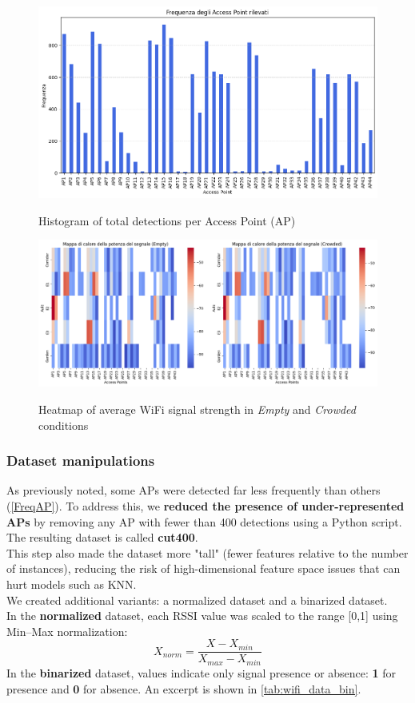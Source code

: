 \documentclass{article}
\begin{document}
\begin{figure}[ht!]
    \centering
    {\includegraphics[scale=0.50]{img/output.png}}
    \caption{Histogram of total detections per Access Point (AP)}
    \label{FreqAP}
\end{figure}

\begin{figure}[ht!]
    \centering
    {\includegraphics[scale=0.38]{img/ColorMap.png}}
    \caption{Heatmap of average Wi\-Fi signal strength in \textit{Empty} and \textit{Crowded} conditions}
    \label{heatmap}
\end{figure}

\subsubsection{Dataset manipulations}
As previously noted, some APs were detected far less frequently than others (\autoref{FreqAP}). To address this, we \textbf{reduced the presence of under-represented APs} by removing any AP with fewer than 400 detections using a Python script. The resulting dataset is called \textbf{cut400}.\\
This step also made the dataset more "tall" (fewer features relative to the number of instances), reducing the risk of high-dimensional feature space issues that can hurt models such as KNN.\\
We created additional variants: a normalized dataset and a binarized dataset.\\
In the \textbf{normalized} dataset, each RSSI value was scaled to the range [0,1] using Min–Max normalization:
\[X_{norm}= \frac{X-X_{min}}{X_{max}-X_{min}}\]
In the \textbf{binarized} dataset, values indicate only signal presence or absence: \textbf{1} for presence and \textbf{0} for absence. An excerpt is shown in \autoref{tab:wifi_data_bin}.\\
\end{document}
